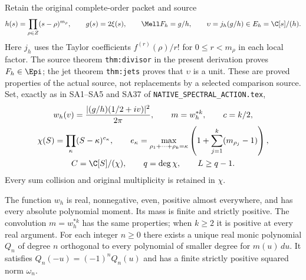 Retain the original complete-order packet and source
\[
 h(s)=\prod_{\rho\in Z}(s-\rho)^{m_\rho},\qquad
 g(s)=2\xi(s),\qquad \Mell F_h=g/h,
 \qquad \upsilon=j_h(g/h)\in E_h=\C[s]/(h).
\]
Here $j_h$ uses the Taylor coefficients
$f^{(r)}(\rho)/r!$ for $0\leq r<m_\rho$ in each local factor.
The source theorem \texttt{thm:divisor} in the present derivation
proves $F_h\in\Epi$; the jet theorem \texttt{thm:jets} proves
that $\upsilon$ is a unit.  These are proved properties of the
actual source, not replacements by a selected comparison source.
Set, exactly as in SA1--SA5 and SA37 of
\texttt{NATIVE\_SPECTRAL\_ACTION.tex},
\begin{gather*}
 w_h(v)=\frac{|(g/h)(1/2+iv)|^2}{2\pi},\qquad
 m=w_h^{*k},\qquad c=k/2,\\
 \chi(S)=\prod_\kappa(S-\kappa)^{e_\kappa},\qquad
 e_\kappa=\max_{\rho_1+\cdots+\rho_k=\kappa}
      \left(1+\sum_{j=1}^k(m_{\rho_j}-1)\right),\\
 C=\C[S]/(\chi),\qquad q=\deg\chi,\qquad L\geq q-1.
\end{gather*}
Every sum collision and original multiplicity is retained in
$\chi$.

\begin{lemma}
\label{wt:lem:measure}
The function $w_h$ is real, nonnegative, even, positive almost
everywhere, and has every absolute polynomial moment.  Its
mass is finite and strictly positive.  The convolution $m=w_h^{*k}$
has the same properties; when $k\geq2$ it is positive at every
real argument.  For each integer $n\geq0$ there exists a unique
real monic polynomial $Q_n$ of degree $n$ orthogonal to every
polynomial of smaller degree for $m(u)\,du$.  It satisfies
$Q_n(-u)=(-1)^nQ_n(u)$ and has a finite strictly positive
squared norm $\omega_n$.
\end{lemma}

